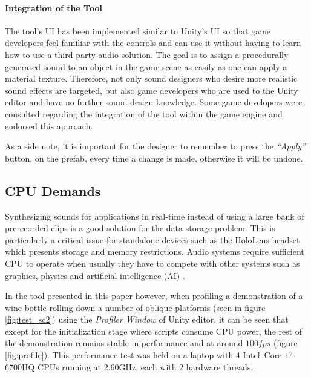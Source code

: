 \paragraph{Integration of the Tool}
\hfill \break

The tool's \gls{UI} has been implemented similar to Unity\textsuperscript{\textregistered}'s \gls{UI} so that game developers feel familiar with the controls and can use it without having to learn how to use a third party audio solution. The goal is to assign a procedurally generated sound to an object in the game scene as easily  as one can apply a material texture. Therefore, not only sound designers who desire more realistic sound effects are targeted, but also game developers who are used to the Unity\textsuperscript{\textregistered} editor and have no further sound design knowledge. Some game developers were consulted regarding the integration of the tool within the game engine and endorsed this approach.

As a side note, it is important for the designer to remember to press the \textit{``Apply''} button, on the prefab, every time a change is made, otherwise it will be undone. 



\subsection{CPU Demands}\label{subsec: cpu}
Synthesizing sounds for applications in real-time instead of using a large bank of prerecorded clips is a good solution for the data storage problem. This is particularly a critical issue for standalone devices such as the HoloLens headset \cite{bib:hololens} which presents storage and memory restrictions. Audio systems require sufficient \gls{CPU} to operate when usually they have to compete with other systems such as graphics, physics and artificial intelligence (AI) \cite{lloyd2011sound}. 

In the tool presented in this paper however, when profiling a demonstration of a wine bottle rolling down a number of oblique platforms (seen in figure \ref{fig:test_sc2}) using the \textit{Profiler Window} of Unity\textsuperscript{\textregistered} editor, it can be seen that except for the initialization stage where scripts consume \gls{CPU} power, the rest of the demonstration remains stable in performance and at around $100 fps$ (figure \ref{fig:profile}). This performance test was held on a laptop with 4 Intel\textregistered\ Core\texttrademark\ i7-6700HQ CPUs running at 2.60GHz, each with 2 hardware threads. 

